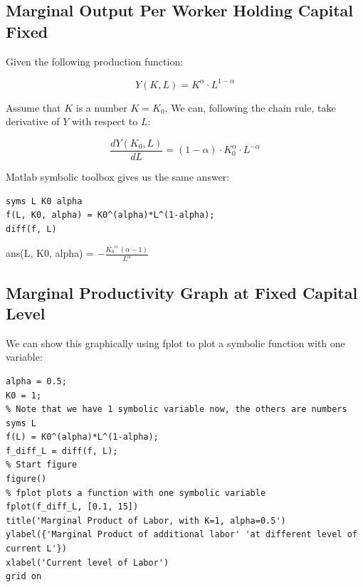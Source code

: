 \documentclass[
]{book}
\begin{document}
\hypertarget{marginal-output-per-worker-holding-capital-fixed}{%
\subsection{Marginal Output Per Worker Holding Capital Fixed}\label{marginal-output-per-worker-holding-capital-fixed}}

Given the following production function:

\[Y(K,L)=K^{\alpha } \cdot L^{1-\alpha }\]

Assume that \(K\) is a number \(K=K_0\), We can, following the chain rule,
take derivative of \(Y\) with respect to \(L\):

\[\frac{dY(K_0 ,L)}{dL}=(1-\alpha )\cdot K_0^{\alpha } \cdot L^{-\alpha }\]

Matlab symbolic toolbox gives us the same answer:

\begin{verbatim}
syms L K0 alpha
f(L, K0, alpha) = K0^(alpha)*L^(1-alpha);
diff(f, L)
\end{verbatim}

ans(L, K0, alpha) =
\(\displaystyle -\frac{{K_0 }^{\alpha } \,{\left(\alpha -1\right)}}{L^{\alpha } }\)

\hypertarget{marginal-productivity-graph-at-fixed-capital-level}{%
\subsection{Marginal Productivity Graph at Fixed Capital Level}\label{marginal-productivity-graph-at-fixed-capital-level}}

We can show this graphically using fplot to plot a symbolic function
with one variable:

\begin{verbatim}
alpha = 0.5;
K0 = 1;
% Note that we have 1 symbolic variable now, the others are numbers
syms L
f(L) = K0^(alpha)*L^(1-alpha);
f_diff_L = diff(f, L);
% Start figure
figure()
% fplot plots a function with one symbolic variable
fplot(f_diff_L, [0.1, 15])
title('Marginal Product of Labor, with K=1, alpha=0.5')
ylabel({'Marginal Product of additional labor' 'at different level of current L'})
xlabel('Current level of Labor')
grid on
\end{verbatim}
\end{document}

